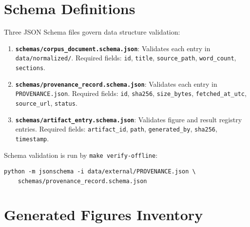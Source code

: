\section{Schema Definitions}
\label{app:schemas}

Three JSON Schema files govern data structure validation:

\begin{enumerate}
    \item \textbf{\texttt{schemas/corpus\_document.schema.json}}:
          Validates each entry in \texttt{data/normalized/}.
          Required fields: \texttt{id}, \texttt{title}, \texttt{source\_path},
          \texttt{word\_count}, \texttt{sections}.
    \item \textbf{\texttt{schemas/provenance\_record.schema.json}}:
          Validates each entry in \texttt{PROVENANCE.json}.
          Required fields: \texttt{id}, \texttt{sha256}, \texttt{size\_bytes},
          \texttt{fetched\_at\_utc}, \texttt{source\_url}, \texttt{status}.
    \item \textbf{\texttt{schemas/artifact\_entry.schema.json}}:
          Validates figure and result registry entries.
          Required fields: \texttt{artifact\_id}, \texttt{path},
          \texttt{generated\_by}, \texttt{sha256}, \texttt{timestamp}.
\end{enumerate}

Schema validation is run by \texttt{make verify-offline}:
\begin{verbatim}
python -m jsonschema -i data/external/PROVENANCE.json \
    schemas/provenance_record.schema.json
\end{verbatim}

\section{Generated Figures Inventory}
\label{app:figures_inventory}

